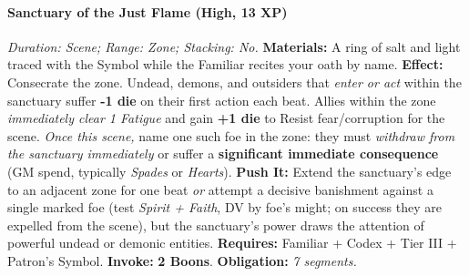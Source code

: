 \paragraph{Sanctuary of the Just Flame (High, 13 XP)} \emph{Duration: Scene; Range: Zone; Stacking: No.}  
\textbf{Materials:} A ring of salt and light traced with the Symbol while the Familiar recites your oath by name.  
\textbf{Effect:} Consecrate the zone. Undead, demons, and outsiders that \emph{enter or act} within the sanctuary suffer \textbf{-1 die} on their first action each beat. Allies within the zone \emph{immediately clear 1 Fatigue} and gain \textbf{+1 die} to Resist fear/corruption for the scene. \emph{Once this scene,} name one such foe in the zone: they must \emph{withdraw from the sanctuary immediately} or suffer a \textbf{significant immediate consequence} (GM spend, typically \emph{Spades} or \emph{Hearts}).  
\textbf{Push It:} Extend the sanctuary's edge to an adjacent zone for one beat \emph{or} attempt a decisive banishment against a single marked foe (test \emph{Spirit + Faith}, DV by foe's might; on success they are expelled from the scene), but the sanctuary's power draws the attention of powerful undead or demonic entities.
\textbf{Requires:} Familiar + Codex + Tier III + Patron's Symbol. \;\; \textbf{Invoke:} \textbf{2 Boons}. \;\; \textbf{Obligation:} \emph{7 segments.}

